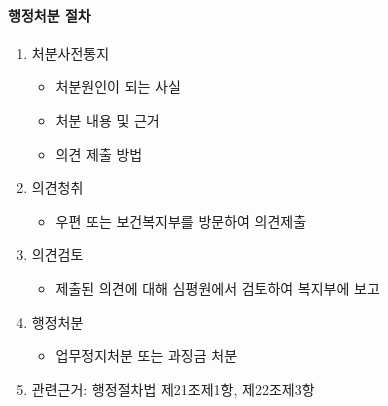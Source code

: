 \paragraph{행정처분 절차}
\begin{enumerate}\tightlist
\item 처분사전통지
	\begin{itemize}\tightlist
	\item 처분원인이 되는 사실
	\item 처분 내용 및 근거
	\item 의견 제출 방법
	\end{itemize}
\item 의견청취
	\begin{itemize}\tightlist
	\item 우편 또는 보건복지부를 방문하여 의견제출
	\end{itemize}
\item 의견검토
	\begin{itemize}\tightlist
	\item 제출된 의견에 대해 심평원에서 검토하여 복지부에 보고
	\end{itemize}
\item 행정처분
	\begin{itemize}\tightlist
	\item 업무정지처분 또는 과징금 처분
	\end{itemize}	
\item 관련근거: 행정절차법 제21조제1항, 제22조제3항	
\end{enumerate}
	
